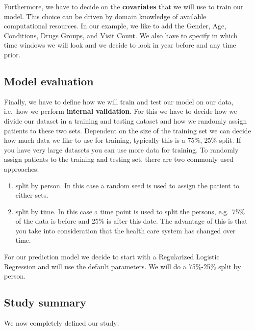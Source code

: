 \documentclass[]{book}
\providecommand{\tightlist}{%
  \setlength{\itemsep}{0pt}\setlength{\parskip}{0pt}}
\begin{document}
Furthermore, we have to decide on the \textbf{covariates} that we will
use to train our model. This choice can be driven by domain knowledge of
available computational resources. In our example, we like to add the
Gender, Age, Conditions, Drugs Groups, and Visit Count. We also have to
specify in which time windows we will look and we decide to look in year
before and any time prior.

\subsection{Model evaluation}\label{model-evaluation}

Finally, we have to define how we will train and test our model on our
data, i.e.~how we perform \textbf{internal validation}. For this we have
to decide how we divide our dataset in a training and testing dataset
and how we randomly assign patients to these two sets. Dependent on the
size of the training set we can decide how much data we like to use for
training, typically this is a 75\%, 25\% split. If you have very large
datasets you can use more data for training. To randomly assign patients
to the training and testing set, there are two commonly used approaches:

\begin{enumerate}
\def\labelenumi{\arabic{enumi}.}
\tightlist
\item
  split by person. In this case a random seed is used to assign the
  patient to either sets.
\item
  split by time. In this case a time point is used to split the persons,
  e.g.~75\% of the data is before and 25\% is after this date. The
  advantage of this is that you take into consideration that the health
  care system has changed over time.
\end{enumerate}

For our prediction model we decide to start with a Regularized Logistic
Regression and will use the default parameters. We will do a 75\%-25\%
split by person.

\subsection{Study summary}\label{study-summary}

We now completely defined our study:
\end{document}
